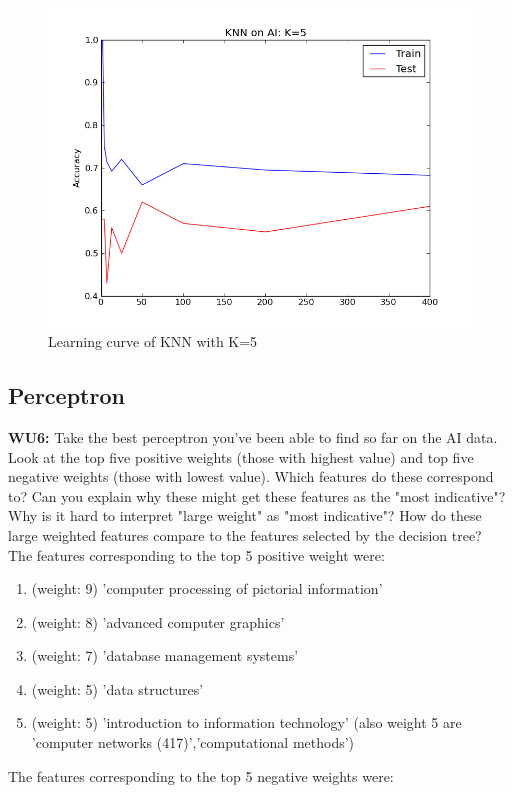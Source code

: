 \documentclass[a4paper,11pt]{article}
\begin{document}
\begin{figure}[h!]
  \caption{Learning curve of KNN with K=5}
\includegraphics[scale=0.7]{knnOnAI.png} 
\end{figure}


\pagebreak
\pagebreak
\subsection{Perceptron}
\textbf{WU6:} \textsf{Take the best perceptron you've been able to find
  so far on the AI data.  Look at the top five positive weights (those
  with highest value) and top five negative weights (those with lowest
  value).  Which features do these correspond to?  Can you explain why
  these might get these features as the "most indicative"?  Why is it
  hard to interpret "large weight" as "most indicative"?  How do these
  large weighted features compare to the features selected by the
  decision tree?}\\


The features corresponding to the top 5 positive weight were:

\begin{enumerate}
\item (weight: 9) 'computer processing of pictorial information' 
\item (weight: 8) 'advanced computer graphics'
\item (weight: 7) 'database management systems'
\item (weight: 5) 'data structures'
\item (weight: 5) 'introduction to information technology' (also
  weight 5 are 'computer networks (417)','computational methods')

\end{enumerate}
The features corresponding to the top 5 negative weights were:
\end{document}
